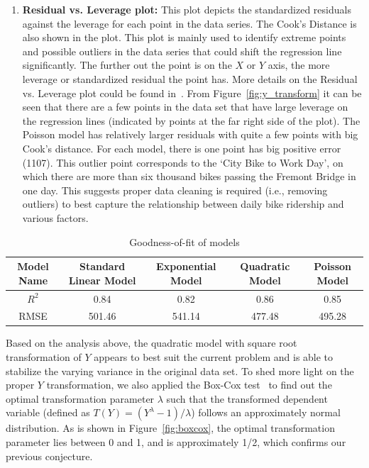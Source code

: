 \documentclass [11pt, proquest] {uwthesis}[2015/03/03]
\begin{document}
\begin{enumerate}
\item \textbf{Residual vs. Leverage plot:} This plot depicts the standardized residuals against the leverage for each point in the data series. The Cook's Distance is also shown in the plot. This plot is mainly used to identify extreme points and possible outliers in the data series that could shift the regression line significantly. The further out the point is on the $X$ or $Y$ axis, the more leverage or standardized residual the point has. More details on the Residual vs. Leverage plot could be found in~\cite{gung13}. From Figure~\ref{fig:y_transform} it can be seen that there are a few points in the data set that have large leverage on the regression lines (indicated by points at the far right side of the plot). The Poisson model has relatively larger residuals with quite a few points with big Cook's distance. For each model, there is one point has big positive error (1107). This outlier point corresponds to the `City Bike to Work Day', on which there are more than six thousand bikes passing the Fremont Bridge in one day. This suggests proper data cleaning is required (i.e., removing outliers) to best capture the relationship between daily bike ridership and various factors. 
\end{enumerate}

\begin{table}
\caption{Goodness-of-fit of models} 
  \label{tbl:ytransform} 
\small
\begin{tabular}{ c | c | c | c | c } 
\hline 
  Model Name & Standard Linear Model & Exponential Model & Quadratic Model & Poisson Model \\ 
\hline
  $R^2$  & 0.84 & 0.82 & 0.86 & 0.85 \\ 
  RMSE  & 501.46 & 541.14 & 477.48 & 495.28 \\ 
\hline 
\end{tabular} 
\end{table} 

Based on the analysis above, the quadratic model with square root transformation of $Y$ appears to best suit the current problem and is able to stabilize the varying variance in the original data set. To shed more light on the proper $Y$ transformation, we also applied the Box-Cox test~\cite{boxcox64} to find out the optimal transformation parameter $\lambda$ such that the transformed dependent variable (defined as $T(Y) = (Y^{\lambda}-1)/\lambda$) follows an approximately normal distribution. As is shown in Figure~\ref{fig:boxcox}, the optimal transformation parameter lies between 0 and 1, and is approximately 1/2, which confirms our previous conjecture.
\end{document}
